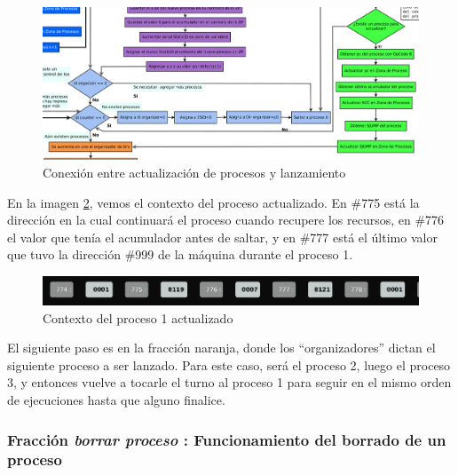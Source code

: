 \documentclass[letterpaper,12pt,oneside]{book}
\begin{document}
		\begin{figure}[ht]		
			\centering
			\includegraphics[scale=0.35]{media/CARDIACC/diagConectActLanzamiento.png}
			\caption{ Conexión entre actualización de procesos y lanzamiento}
			\label{fig:diagConectActLanzamiento}
		\end{figure}		
		
		
		En la imagen \ref{fig:proceso1ZPactualizadaP1}, vemos el contexto del proceso actualizado. En \#775 está la dirección en la cual continuará
		el proceso cuando recupere los recursos, en \#776 el valor que tenía el acumulador antes de saltar, y en \#777 está el último valor que tuvo la 
		dirección \#999 de la máquina durante el proceso 1.
		
		
		\begin{figure}[h]		
			\centering
			\includegraphics[scale=0.5]{media/CARDIACC/proceso1ZPactualizadaP1.png}
			\caption{ Contexto del proceso 1 actualizado}
			\label{fig:proceso1ZPactualizadaP1}
		\end{figure}		
		
		
		El siguiente paso es en la fracción naranja, donde los ``organizadores'' dictan el siguiente proceso a ser lanzado. Para este caso, será el 
		proceso 2, luego
		el proceso 3, y entonces vuelve a tocarle el turno al proceso 1 para seguir en el mismo orden de ejecuciones hasta que alguno finalice.
		
		
		\subsubsection{Fracción \textit{borrar proceso} : Funcionamiento del borrado de un proceso}
		
\end{document}
